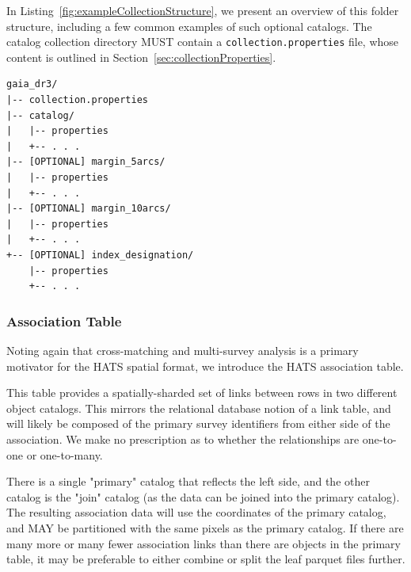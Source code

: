 \documentclass[11pt,a4paper]{ivoa}
\begin{document}
In Listing~\ref{fig:exampleCollectionStructure}, we present an overview of this folder structure, including a few common examples of such optional catalogs.
The catalog collection directory MUST contain a \texttt{collection.properties} file, whose content is outlined in Section~\ref{sec:collectionProperties}.

\begin{minipage}{\linewidth}
\begin{lstlisting}[caption=Example collection directory contents, label=fig:exampleCollectionStructure]
gaia_dr3/
|-- collection.properties
|-- catalog/
|   |-- properties
|   +-- . . .
|-- [OPTIONAL] margin_5arcs/
|   |-- properties
|   +-- . . .
|-- [OPTIONAL] margin_10arcs/
|   |-- properties
|   +-- . . .
+-- [OPTIONAL] index_designation/
    |-- properties
    +-- . . .
\end{lstlisting}
\end{minipage}

\subsubsection{Association Table} \label{sec:association}

Noting again that cross-matching and multi-survey analysis is a primary motivator for the HATS spatial format, we introduce the HATS association table. 

This table provides a spatially-sharded set of links between rows in two different object catalogs. 
This mirrors the relational database notion of a link table, and will likely be composed of the primary survey identifiers from either side of the association.
We make no prescription as to whether the relationships are one-to-one or one-to-many. \par

There is a single "primary" catalog that reflects the left side, and the other catalog is the "join" catalog (as the data can be joined into the primary catalog).
The resulting association data will use the coordinates of the primary catalog, and MAY be partitioned with the same pixels as the primary catalog.
If there are many more or many fewer association links than there are objects in the primary table, it may be preferable to either combine or split the leaf parquet files further.

\end{document}
